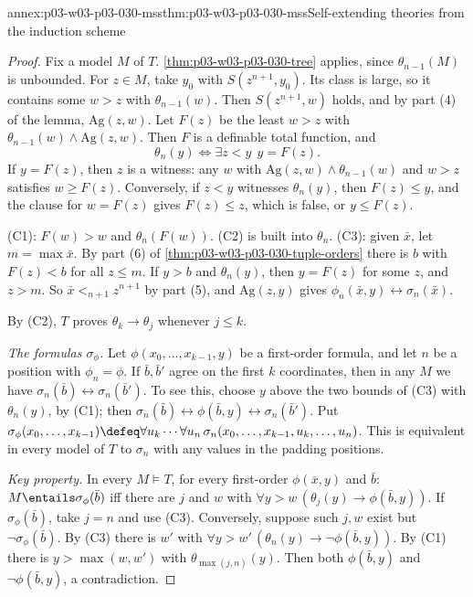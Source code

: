 \begin{annexitem}{annex:p03-w03-p03-030-mss}{thm:p03-w03-p03-030-mss}{Self-extending theories from the induction scheme}
\begin{proof}
Fix a model \(M\) of \(T\).  \cref{thm:p03-w03-p03-030-tree} applies, since
\(\theta_{n-1}(M)\) is unbounded.  For \(z\in M\), take \(y_0\) with
\(S(z^{n+1},y_0)\).  Its class is large, so it contains some \(w>z\) with
\(\theta_{n-1}(w)\).  Then \(S(z^{n+1},w)\) holds, and by part (4) of the
lemma, \(\mathrm{Ag}(z,w)\).  Let \(F(z)\) be the least \(w>z\) with
\(\theta_{n-1}(w)\wedge\mathrm{Ag}(z,w)\).  Then \(F\) is a definable total
function, and
\[
 \theta_n(y)\iff\exists z<y\ \ y=F(z).
\]
If \(y=F(z)\), then \(z\) is a witness: any \(w\) with \(\mathrm{Ag}(z,w)\wedge
\theta_{n-1}(w)\) and \(w>z\) satisfies \(w\ge F(z)\).  Conversely, if
\(z<y\) witnesses \(\theta_n(y)\), then \(F(z)\le y\), and the clause for
\(w=F(z)\) gives \(F(z)\le z\), which is false, or \(y\le F(z)\).

(C1): \(F(w)>w\) and \(\theta_n(F(w))\).  (C2) is built into \(\theta_n\).
(C3): given \(\bar x\), let \(m=\max\bar x\).  By part (6) of
\cref{thm:p03-w03-p03-030-tuple-orders} there is \(b\) with \(F(z)<b\) for all
\(z\le m\).  If \(y>b\) and \(\theta_n(y)\), then \(y=F(z)\) for some \(z\),
and \(z>m\).  So \(\bar x<_{n+1}z^{n+1}\) by part (5), and \(\mathrm{Ag}(z,y)\)
gives \(\phi_n(\bar x,y)\leftrightarrow\sigma_n(\bar x)\).

By (C2), \(T\) proves \(\theta_k\rightarrow\theta_j\) whenever \(j\le k\).

\emph{The formulas \(\sigma_\phi\).}  Let \(\phi(x_0,\ldots,x_{k-1},y)\) be a
first-order formula, and let \(n\) be a position with \(\phi_n=\phi\).  If
\(\bar b,\bar b'\) agree on the first \(k\) coordinates, then in any \(M\)
we have \(\sigma_n(\bar b)\leftrightarrow\sigma_n(\bar b')\).  To see this,
choose \(y\) above the two bounds of (C3) with \(\theta_n(y)\), by (C1); then
\(\sigma_n(\bar b)\leftrightarrow\phi(\bar b,y)\leftrightarrow\sigma_n(\bar
b')\).  Put \(\sigma_\phi(x_0,\ldots,x_{k-1})\defeq\forall
u_k\cdots\forall u_n\,\sigma_n(x_0,\ldots,x_{k-1},u_k,\ldots,u_n)\).  This is
equivalent in every model of \(T\) to \(\sigma_n\) with any values in the
padding positions.

\emph{Key property.}  In every \(M\models T\), for every first-order
\(\phi(\bar x,y)\) and \(\bar b\): \(M\entails\sigma_\phi(\bar b)\) iff there
are \(j\) and \(w\) with \(\forall y>w\,(\theta_j(y)\rightarrow\phi(\bar
b,y))\).  If \(\sigma_\phi(\bar b)\), take \(j=n\) and use (C3).  Conversely,
suppose such \(j,w\) exist but \(\neg\sigma_\phi(\bar b)\).  By (C3) there is
\(w'\) with \(\forall y>w'\,(\theta_n(y)\rightarrow\neg\phi(\bar b,y))\).  By
(C1) there is \(y>\max(w,w')\) with \(\theta_{\max(j,n)}(y)\).  Then both
\(\phi(\bar b,y)\) and \(\neg\phi(\bar b,y)\), a contradiction.


\end{proof}
\end{annexitem}
